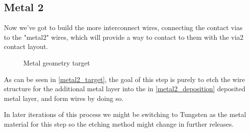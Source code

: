 \subsection{Metal 2}\label{chapter_metal2}
Now we've got to build the more interconnect wires, connecting the contact vias to the "metal2" wires, which will provide a way to contact to them with the via2 contact layout.

\begin{figure}[H]
	\centering
	\begin{tikzpicture}[node distance = 3cm, auto, thick,scale=\CrossAndTopSectionBig, every node/.style={transform shape}]
		
	\end{tikzpicture}
	\caption{Metal geometry target}
	\label{metal2_target}
\end{figure}

As can be seen in \autoref{metal2_target}, the goal of this step is purely to etch the wire structure for the additional metal layer into the in \autoref{metal2_deposition} deposited metal layer, and form wires by doing so.

In later iterations of this process we might be switching to Tungsten as the metal material for this step so the etching method might change in further releases.
